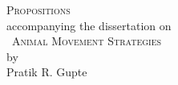 \begingroup

\clearpage

\begin{onehalfspace}
    \begin{center}
        {\LARGE \scshape{Propositions}} \\
        {\small accompanying the dissertation on}\\
        {\large \adftripleflourishleft~\scshape{Animal Movement Strategies}~\adftripleflourishright}\\
        by\\
        Pratik R. Gupte
    \end{center}
\end{onehalfspace}

